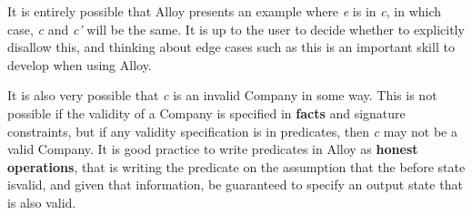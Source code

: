 \documentclass[10pt]{article}
\begin{document}
      It is entirely possible that Alloy presents an example where \textit{e} is in \textit{c}, in which case, \textit{c} and \textit{c'} will be the same. It is up to the user to decide whether to explicitly disallow this, and thinking about edge cases such as this is an important skill to develop when using Alloy.\par
      It is also very possible that \textit{c} is an invalid Company in some way. This is not possible if the validity of a Company is specified in \textbf{facts} and signature constraints, but if any validity specification is in predicates, then \textit{c} may not be a valid Company. It is good practice to write predicates in Alloy as \textbf{honest operations}, that is writing the predicate on the assumption that the before state isvalid, and given that information, be guaranteed to specify an output state that is also valid.
\end{document}
